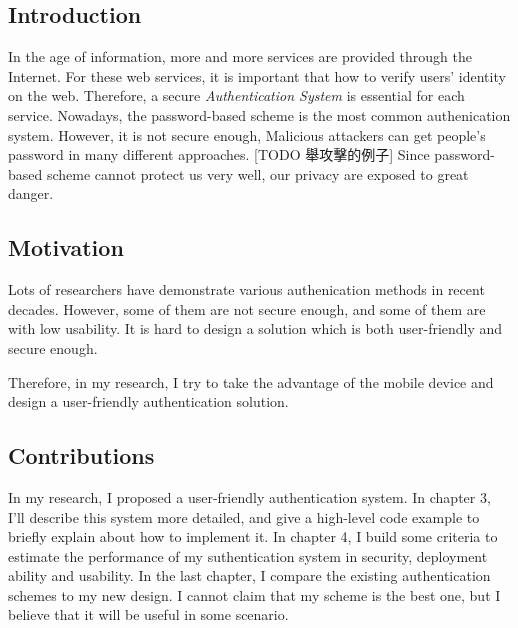 
\begin{CJK}{Bg5}{bsmi}



\chapter{Introduction}

In the age of information, more and more services are provided through the Internet. For these web services, it is important that how to verify users' identity on the web. Therefore, a secure \emph{Authentication System} is essential for each service. Nowadays, the password-based scheme is the most common authenication system. However, it is not secure enough, Malicious attackers can get people's password in many different approaches. [TODO 舉攻擊的例子] Since password-based scheme cannot protect us very well, our privacy are exposed to great danger.

\section{Motivation}

Lots of researchers have demonstrate various authenication methods in recent decades. However, some of them are not secure enough, and some of them are with low usability. It is hard to design a solution which is both user-friendly and secure enough.

Therefore, in my research, I try to take the advantage of the mobile device and design a user-friendly authentication solution. 

\section{Contributions}

In my research, I proposed a user-friendly authentication system. In chapter 3, I'll describe this system more detailed, and give a high-level code example to briefly explain about how to implement it. In chapter 4, I build some criteria to estimate the performance of my suthentication system in security, deployment ability and usability. In the last chapter, I compare the existing authentication schemes to my new design. I cannot claim that my scheme is the best one, but I believe that it will be useful in some scenario. 

\end{CJK}
